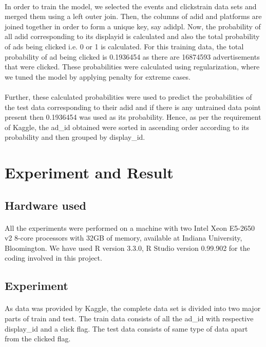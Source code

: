 \documentclass[fleqn,10pt]{SelfArx} %
\begin{document}
\paragraph{}In order to train the model, we selected the events and clicks\textunderscore train data sets and merged them using a left outer join. Then, the columns of  ad\textunderscore id  and platforms are joined together in order to form a unique key, say ad\textunderscore id\textunderscore pl. Now, the probability of all ad\textunderscore id corresponding to its display\textunderscore id is calculated and also the total probability of ads being clicked i.e. 0 or 1 is calculated. For this training data, the total probability of ad being clicked is 0.1936454 as there are 16874593 advertisements that were clicked. These probabilities were calculated using regularization, where we tuned the model by applying penalty for extreme cases.
\\ \\
Further, these calculated probabilities were used to predict the probabilities of the test data corresponding to their ad\textunderscore id and if there is any untrained data point present then 0.1936454 was used as its probability. Hence, as per the requirement of Kaggle, the ad\_id obtained were sorted in ascending order according to its probability and then grouped by display\_id. 

\section{Experiment and Result}
\subsection{Hardware used}
\paragraph{} All the experiments were performed on a machine with two Intel Xeon E5-2650 v2 8-core processors with 32GB of memory, available at Indiana University, Bloomington. We have used R version 3.3.0, R Studio version 0.99.902 for the coding involved in this project.
\subsection{Experiment}
\paragraph{} As data was provided by Kaggle, the complete data set is divided into two major parts of train and test. The train data consists of all the ad\_id with respective display\_id and a click flag. The test data consists of same type of data apart from the clicked flag. 
\end{document}

